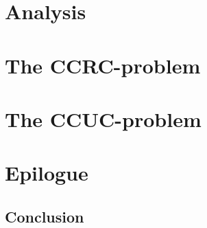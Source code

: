 
\part{Analysis}\label{Analysis}



\part{The CCRC-problem}




\part{The CCUC-problem}

\part{Epilogue}

\chapter{Conclusion}



